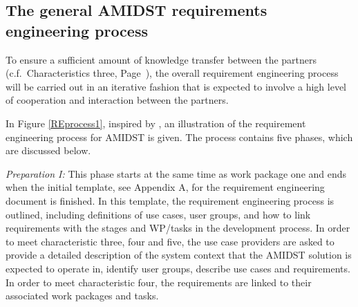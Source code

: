 


\subsection{The general AMIDST requirements engineering process}
\label{sec:reprocess}

To ensure a sufficient amount of knowledge transfer between the partners (c.f.\ Characteristics three, Page~\pageref{sec:characteristic3}),
the overall  requirement engineering process will be carried out in an iterative fashion that is expected to involve a
high level of cooperation and interaction between the partners.  

In Figure \ref{REprocess1}, inspired by \cite{Ebe10}, an illustration of the requirement engineering process for AMIDST is given.  The process contains five phases, which are discussed below.

\emph{Preparation I:}  This phase starts at the same time as work package one and ends when the initial template,
see Appendix A, for the requirement engineering document is finished.  In this template, the requirement engineering process
is outlined, including definitions of use cases, user groups, and how to link requirements with the stages and WP/tasks
in the development process.  In order to meet characteristic three, four and five, the use case providers are asked to
provide a detailed description of the system context that the AMIDST solution is expected to operate in, identify user
groups, describe use cases and requirements.  In order to meet characteristic four, the requirements are linked to their
associated work packages and tasks. 

